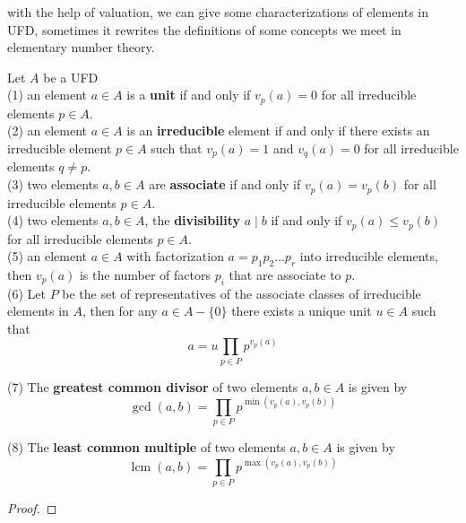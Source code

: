 \documentclass[12pt,a4paper]{article}
\begin{document}
with the help of valuation, we can give some characterizations of elements in UFD, sometimes it rewrites the definitions of some concepts we meet in elementary number theory.
\begin{propositionplain}
    Let \(A\) be a UFD\\

    (1) an element \(a \in A\) is a \textbf{unit} if and only if \(v_p(a) = 0\) for all irreducible elements \(p \in A\).\\

    (2) an element \(a \in A\) is an \textbf{irreducible} element if and only if there exists an irreducible element \(p \in A\) such that \(v_p(a) = 1\) and \(v_q(a) = 0\) for all irreducible elements \(q \neq p\).\\

    (3) two elements \(a,b \in A\) are \textbf{associate} if and only if \(v_p(a) = v_p(b)\) for all irreducible elements \(p \in A\).\\

    (4) two elements \(a,b \in A\), the \textbf{divisibility} \(a \mid b\) if and only if \(v_p(a) \leq v_p(b)\) for all irreducible elements \(p \in A\).\\

    (5) an element \(a \in A\) with factorization \(a = p_1p_2\dots p_r\) into irreducible elements, then \(v_p(a)\) is the number of factors \(p_i\) that are associate to \(p\).\\

    (6) Let \(P\) be the set of representatives of the associate classes of irreducible elements in \(A\), then for any \(a \in A-\{0\}\) there exists a unique unit \(u \in A\) such that
    \[a = u \prod_{p \in P} p^{v_p(a)}\]

    (7) The \textbf{greatest common divisor} of two elements \(a,b \in A\) is given by
    \[\gcd(a,b) = \prod_{p \in P} p^{\min(v_p(a),v_p(b))}\]

    (8) The \textbf{least common multiple} of two elements \(a,b \in A\) is given by
    \[\operatorname{lcm}(a,b) = \prod_{p \in P} p^{\max(v_p(a),v_p(b))}\]
\end{propositionplain}
\begin{proof}
    
\end{proof}
\end{document}

